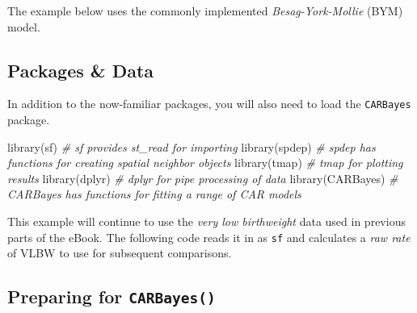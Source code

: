 \documentclass[
]{book}
\newenvironment{Shaded}{\begin{snugshade}}{\end{snugshade}}
\newcommand{\AttributeTok}[1]{\textcolor[rgb]{0.77,0.63,0.00}{#1}}
\newcommand{\CommentTok}[1]{\textcolor[rgb]{0.56,0.35,0.01}{\textit{#1}}}
\newcommand{\FunctionTok}[1]{\textcolor[rgb]{0.00,0.00,0.00}{#1}}
\newcommand{\NormalTok}[1]{#1}
\newcommand{\OtherTok}[1]{\textcolor[rgb]{0.56,0.35,0.01}{#1}}
\newcommand{\SpecialCharTok}[1]{\textcolor[rgb]{0.00,0.00,0.00}{#1}}
\newcommand{\StringTok}[1]{\textcolor[rgb]{0.31,0.60,0.02}{#1}}
\begin{document}
The example below uses the commonly implemented \emph{Besag-York-Mollie} (BYM) model.

\hypertarget{packages-data}{%
\subsection{Packages \& Data}\label{packages-data}}

In addition to the now-familiar packages, you will also need to load the \texttt{CARBayes} package.

\begin{Shaded}
\begin{Highlighting}[]
\FunctionTok{library}\NormalTok{(sf)        }\CommentTok{\# sf provides st\_read for importing}
\FunctionTok{library}\NormalTok{(spdep)     }\CommentTok{\# spdep has functions for creating spatial neighbor objects}
\FunctionTok{library}\NormalTok{(tmap)      }\CommentTok{\# tmap for plotting results}
\FunctionTok{library}\NormalTok{(dplyr)     }\CommentTok{\# dplyr for pipe processing of data}
\FunctionTok{library}\NormalTok{(CARBayes)  }\CommentTok{\# CARBayes has functions for fitting a range of CAR models}
\end{Highlighting}
\end{Shaded}

This example will continue to use the \emph{very low birthweight} data used in previous parts of the eBook. The following code reads it in as \texttt{sf} and calculates a \emph{raw rate} of VLBW to use for subsequent comparisons.

\begin{Shaded}
\end{Shaded}

\hypertarget{preparing-for-carbayes}{%
\subsection{\texorpdfstring{Preparing for \texttt{CARBayes()}}{Preparing for CARBayes()}}\label{preparing-for-carbayes}}
\end{document}
